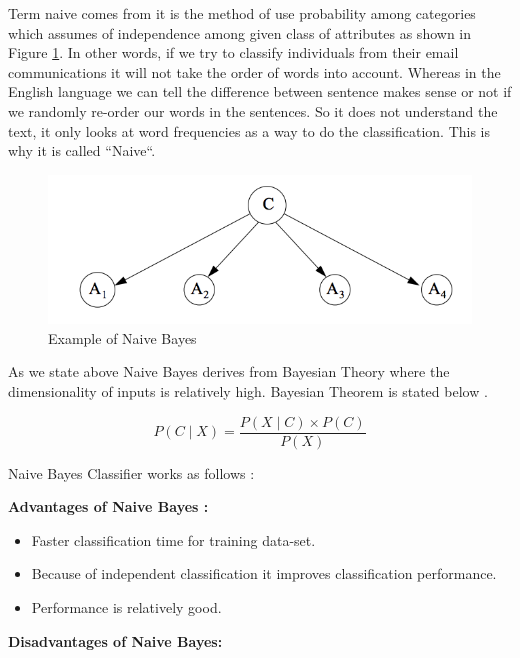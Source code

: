 \documentclass[sigconf]{acmart}
\begin{document}
\par Term naive comes from it is the method of use probability among categories which assumes of independence among given class of attributes as shown in Figure \ref{fig:Naive Bayes}. In other words, if we try to classify individuals from their email communications it will not take the order of words into account. Whereas in the English language we can tell the difference between sentence makes sense or not if we randomly re-order our words in the sentences. So it does not understand the text, it only looks at word frequencies as a way to do the classification. This is why it is called ``Naive``.  

 \begin{figure}[!ht]
    \centering
    \graphicspath{{images/}}
    \includegraphics[width=\columnwidth]{Naive-bayes}
    \caption{Example of Naive Bayes \cite{Zhang}}\label{fig:Naive Bayes}
\end{figure}


\par As we state above Naive Bayes derives from Bayesian Theory where the dimensionality of inputs is relatively high. Bayesian Theorem is stated below \cite{Sayali}.

\begin{equation}
P(C \mid X) = \frac{P(X \mid C) \times P(C)} {P(X)}
\end{equation}

Naive Bayes Classifier works as follows \cite{Sayali}:

\textbf{Advantages of Naive Bayes \cite{Sayali}:}
\begin{itemize}
\item Faster classification time for training data-set.
\item Because of independent classification it improves classification performance.
\item Performance is relatively good. 
\end{itemize}

\textbf{Disadvantages of Naive Bayes\cite{Sayali}:}
\end{document}
